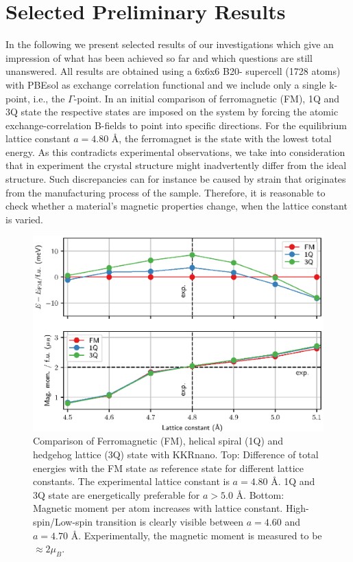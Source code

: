 \documentclass [a4paper, 12pt]{article}
\begin{document}
\section{Selected Preliminary Results}

In the following we present selected results of our investigations which give an impression
of what has been achieved so far and which questions are still unanswered.
All results are obtained using a 6x6x6 B20- supercell (1728 atoms) with 
PBEsol as exchange correlation functional
and we include only a single k-point, i.e., the $\Gamma$-point.
In an initial comparison of ferromagnetic (FM), 1Q and 3Q state the respective states are imposed on
the system by forcing the atomic exchange-correlation B-fields
to point into specific directions. 
For the equilibrium lattice constant
$a=4.80$ \AA, the ferromagnet is the state with the lowest total energy.
As this contradicts experimental observations, we take into consideration that
in experiment the crystal structure might inadvertently differ from the ideal structure.
Such discrepancies can for instance be caused by strain that 
originates from the manufacturing process of the sample.
Therefore, it is reasonable to check whether a material's magnetic properties change, when the
lattice constant is varied.
\begin{figure}[htb]
  \centering
   \includegraphics[width=1.00\textwidth]{Figures/MnGe_ferro_1q.eps}
	\caption{Comparison of Ferromagnetic (FM), helical spiral (1Q) and hedgehog lattice (3Q) 
	state with KKRnano.
	Top: Difference of total energies with the FM state as reference state for different
	lattice constants. The experimental lattice constant is $a=4.80$ \AA. 1Q and 3Q state
	are energetically preferable for $a > 5.0$ \AA.
	Bottom: Magnetic moment per  atom increases with lattice constant.
	High-spin/Low-spin transition is clearly visible between $a=4.60$ and $a=4.70$ \AA.
	Experimentally, the magnetic moment is measured to be $\approx 2 \mu_B$.
}
\label{fig:MnGe_kkrnano_comparison}
\end{figure}
\end{document}
